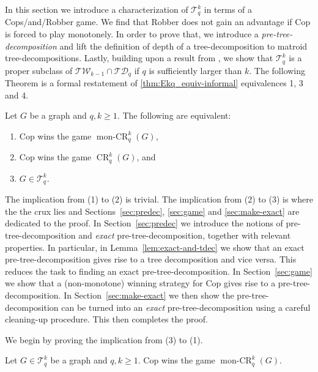 \documentclass{lmcs}
\theoremstyle{plain}\newtheorem{claim}[thm]{Claim}   %
\newcommand{\cT}{\ensuremath{\mathcal T}}
\DeclareMathOperator{\CR}{CR}
\DeclareMathOperator{\monCR}{mon-CR}
\newcommand{\TW}{\ensuremath{\mathcal{TW}}}
\newcommand{\TD}{\ensuremath{\mathcal{TD}}}
\newcommand{\Ekq}{\ensuremath{\cT_{q}^{k}}}
\newcommand{\preTreeDec}{pre-tree-decomposition}
\begin{document}
In this section we introduce a characterization of $\Ekq$ in terms of a Cops\-/and\-/Robber game.
We find that Robber does not gain an advantage if Cop is forced to play monotonely.
In order to prove that, we introduce a \emph{\preTreeDec} and lift the definition of depth of a tree-decomposition to matroid tree-decompositions.
Lastly, building upon a result from \cite{Furer_rounds_2001}, we show that $\Ekq$ is a proper subclass of $\TW_{k-1} \cap \TD_q$ if $q$ is sufficiently larger than $k$.
The following Theorem is a formal restatement of \autoref{thm:Ekq_equiv-informal} equivalences 1, 3 and 4.

\begin{thm}
	\label{thm:Ekq-cops}
	Let $G$ be a graph and $q,k\geq 1$.
	The following are equivalent:
	\begin{enumerate}
		\item Cop wins the game $\monCR_q^{k}(G)$,
		\item Cop wins the game $\CR_q^{k}(G)$, and
		\item $G\in \Ekq$.
	\end{enumerate}
\end{thm}

The implication from (1) to (2) is trivial.
The implication from (2) to (3) is where the the crux lies and Sections~\ref{sec:predec}, \ref{sec:game} and
\ref{sec:make-exact} are dedicated to the proof.
In Section~\ref{sec:predec} we introduce the notions of pre-tree-decomposition
and \emph{exact} pre-tree-decomposition,
together with relevant properties. In particular, 
in Lemma~\ref{lem:exact-and-tdec} we show that an exact pre-tree-decomposition gives rise to a tree decomposition and vice versa. This reduces the task to finding an exact pre-tree-decomposition. 
In Section~\ref{sec:game} we show
that a (non-monotone) winning strategy for Cop gives rise to a pre-tree-decomposition. In Section~\ref{sec:make-exact} we then show the pre-tree-decomposition can be turned into an \emph{exact} pre-tree-decomposition using a careful cleaning-up procedure. 
This then completes the proof.

We begin by proving the implication from (3) to (1).

\begin{lem}
	Let $G\in \Ekq$ be a graph and $q,k\geq 1$. Cop wins the game $\monCR_q^{k}(G)$.
\end{lem} 
\end{document}
